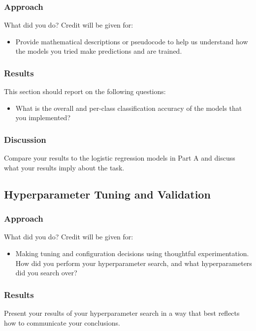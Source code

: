 \documentclass[11pt]{article}
\begin{document}
\subsubsection{Approach}

What did you do? Credit will be given for:

  \begin{itemize}
  \item Provide mathematical descriptions or pseudocode to help us understand how the models you tried make predictions and are trained.
  \end{itemize}

\subsubsection{Results}
This section should report on the following questions: 

\begin{itemize}
\item  What is the overall and per-class classification accuracy of the models that you implemented?
\end{itemize}


\subsubsection{Discussion}
Compare your results to the logistic regression models in Part A and discuss what your results imply about the task.


\subsection{Hyperparameter Tuning and Validation}

\subsubsection{Approach}
What did you do? Credit will be given for:

  \begin{itemize}
  \item Making tuning and configuration decisions using thoughtful experimentation.  
    How did you perform your hyperparameter search, and what hyperparameters did you search over?
  \end{itemize}

\subsubsection{Results}
Present your results of your hyperparameter search in a way that best reflects how to communicate your conclusions.
\end{document}
